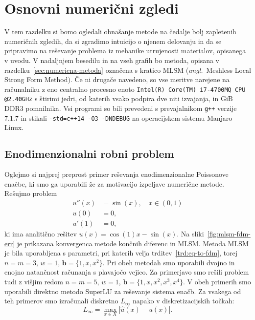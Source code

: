 \documentclass[12pt,a4paper,twoside]{article}
\theoremstyle{definition} %
\theoremstyle{plain} %
\numberwithin{equation}{section}
\renewcommand{\b}{\boldsymbol}
\newcommand{\ang}[1]{(\hspace{-1.5px}\textit{angl.}\ #1)}
\let\oldsection\section
\def\section{\cleardoublepage\oldsection}
\begin{document}
\section{Osnovni numerični zgledi}
\label{sec:osnovni-zgledi}
V tem razdelku si bomo ogledali obnašanje metode na čedalje bolj zapletenih numeričnih zgledih, da
si zgradimo intuicijo o njenem delovanju in da se pripravimo na reševanje problema iz mehanike
utrujenosti materialov, opisanega v uvodu. V nadaljnjem besedilu in na vseh grafih bo metoda,
opisana v razdelku~\ref{sec:numericna-metoda} označena s kratico MLSM \ang{Meshless Local Strong
Form Method}. Če ni drugače navedeno, so vse meritve narejene na računalniku z eno centralno
procesno enoto \verb|Intel(R) Core(TM) i7-4700MQ CPU @2.40GHz| s štirimi jedri, od katerih vsako
podpira dve niti izvajanja, in \unit[16]{GiB} DDR3 pomnilnika. Vsi programi so bili prevedeni s
prevajalnikom \verb|g++| verzije 7.1.7 in stikali \verb|-std=c++14 -O3 -DNDEBUG| na operacijskem
sistemu Manjaro Linux.

\subsection{Enodimenzionalni robni problem}
Oglejmo si najprej preprost primer reševanja enodimenzionalne Poissonove enačbe, ki smo ga uporabili
že za motivacijo izpeljave numerične metode. Rešujmo problem
\begin{align}
  u''(x) &= \sin(x), \quad x \in (0, 1) \nonumber \\
  u(0) &= 0,  \\
  u'(1) &= 0, \nonumber
\end{align}
ki ima analitično rešitev $u(x) = \cos(1) x - \sin(x)$.
Na sliki~\ref{fig:mlsm-fdm-err} je prikazana konvergenca metode končnih diferenc
in MLSM. Metoda MLSM je bila uporabljena s parametri, pri katerih velja
trditev~\ref{trd:eq-to-fdm}, torej $n=m=3$, $w=1$, $\b b = \{1, x, x^2\}$.
Pri obeh metodah smo uporabili dvojno in enojno natančnost računanja s plavajočo
vejico. Za primerjavo smo rešili problem tudi z višjim redom $n=m=5$, $w=1$,
$\b b = \{1, x, x^2, x^3, x^4\}$. V obeh primerih smo uporabili direktno metodo
SuperLU za reševanje sistema enačb. Za vsakega od teh primerov smo izračunali
diskretno $L_\infty$ napako v diskretizacijskih točkah: \[ L_\infty = \max_{x\in
X} |\hat{u}(x) - u(x)|. \]
\end{document}
